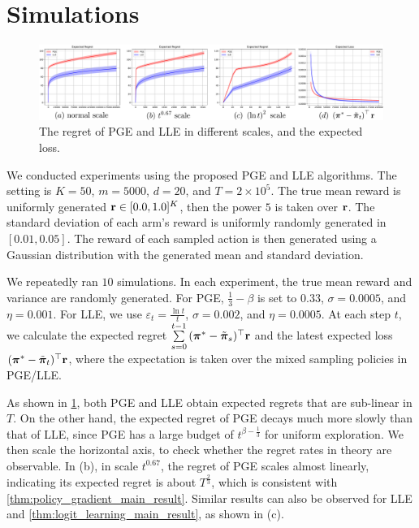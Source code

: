 \section{Simulations}
\label{sec:sumulations}

\begin{figure}[h]
\label{fig:regret_loss_scales}
\centering
\includegraphics[width=1\linewidth]{comparison_PGE_LLE_regret_scales.pdf}
\caption{The regret of PGE and LLE in different scales, and the expected loss.}
\end{figure}

We conducted experiments using the proposed PGE and LLE algorithms. The setting is $K = 50$, $m = 5000$, $d = 20$, and $T = 2 \times 10^5$. The true mean reward is uniformly generated ${\mathbf{r}} \in [0.0, 1.0]^K$, then the power $5$ is taken over ${\mathbf{r}}$. The standard deviation of each arm's reward is uniformly randomly generated in $[0.01, 0.05]$. The reward of each sampled action is then generated using a Gaussian distribution with the generated mean and standard deviation.

We repeatedly ran $10$ simulations. In each experiment, the true mean reward and variance are randomly generated. For PGE, $\frac{1}{3} - \beta$ is set to $0.33$, $\sigma = 0.0005$, and $\eta = 0.001$. For LLE, we use $\varepsilon_t = \frac{\ln{t}}{t}$, $\sigma = 0.002$, and $\eta = 0.0005$. At each step $t$, we calculate the expected regret $\sum\limits_{s = 0}^{t - 1}{ ( {{\boldsymbol{\pi}}^*}  - \tilde{{\boldsymbol{\pi}}}_s)^\top {\mathbf{r}} } $ and the latest expected loss $( {{\boldsymbol{\pi}}^*}  - \tilde{{\boldsymbol{\pi}}}_t)^\top {\mathbf{r}}$, where the expectation is taken over the mixed sampling policies in PGE/LLE.

As shown in \cref{fig:regret_loss_scales}, both PGE and LLE obtain expected regrets that are sub-linear in $T$. On the other hand, the expected regret of PGE decays much more slowly than that of LLE, since PGE has a large budget of $t^{\beta - \frac{1}{3}}$ for uniform exploration. We then scale the horizontal axis, to check whether the regret rates in theory are observable. In (b), in scale $t^{0.67}$, the regret of PGE scales almost linearly, indicating its expected regret is about $T^{\frac{2}{3}}$, which is consistent with \cref{thm:policy_gradient_main_result}. Similar results can also be observed for LLE and \cref{thm:logit_learning_main_result}, as shown in (c).
